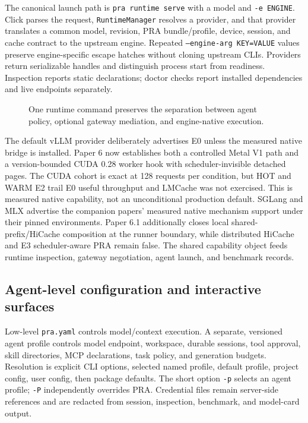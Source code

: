 \documentclass[11pt]{article}
\begin{document}
The canonical launch path is \texttt{pra runtime serve} with a model and
\texttt{-e ENGINE}. Click parses the request, \texttt{RuntimeManager} resolves a provider, and that
provider translates a common model, revision, PRA bundle/profile, device,
session, and cache contract to the upstream engine. Repeated
\texttt{--engine-arg KEY=VALUE} values preserve engine-specific escape hatches
without cloning upstream CLIs. Providers return serializable handles and
distinguish process start from readiness. Inspection reports static declarations;
doctor checks report installed dependencies and live endpoints separately.

\begin{figure}[H]
\centering
{}
\caption{One runtime command preserves the separation between agent policy,
optional gateway mediation, and engine-native execution.}
\label{fig:runtime-provider}
\end{figure}

The default vLLM provider deliberately advertises E0 unless the measured native
bridge is installed. Paper 6 now establishes both a controlled Metal V1 path
and a version-bounded CUDA 0.28 worker hook with scheduler-invisible detached
pages. The CUDA cohort is exact at 128 requests per condition, but HOT and WARM
E2 trail E0 useful throughput and LMCache was not exercised. This is measured
native capability, not an unconditional production default.
SGLang and MLX advertise the companion papers' measured native mechanism
support under their pinned environments. Paper 6.1 additionally closes local
shared-prefix/HiCache composition at the runner boundary, while distributed
HiCache and E3 scheduler-aware PRA remain false. The shared
capability object feeds runtime inspection, gateway negotiation, agent launch,
and benchmark records.

\subsection{Agent-level configuration and interactive surfaces}

Low-level \texttt{pra.yaml} controls model/context execution. A separate,
versioned agent profile controls model endpoint, workspace, durable sessions,
tool approval, skill directories, MCP declarations, task policy, and generation
budgets. Resolution is explicit CLI options, selected named profile, default
profile, project config, user config, then package defaults. The short option
\texttt{-p} selects an agent profile; \texttt{-P} independently overrides PRA.
Credential files remain server-side references and are redacted from session,
inspection, benchmark, and model-card output.
\end{document}
